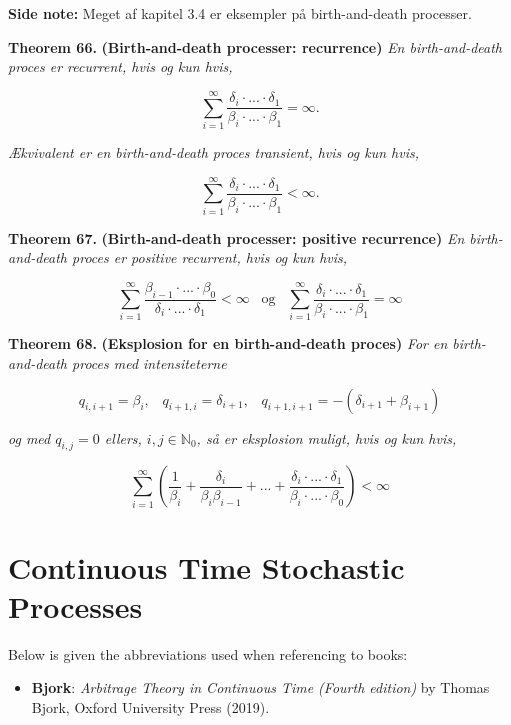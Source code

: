 \documentclass[a4paper,10pt,openany]{book}
\providecommand{\tightlist}{%
 \setlength{\itemsep}{0pt}\setlength{\parskip}{0pt}}
\begin{document}
\textbf{Side note:} Meget af kapitel 3.4 er eksempler på birth-and-death processer.

\textbf{Theorem 66.} \textbf{(Birth-and-death processer: recurrence)} \emph{En birth-and-death proces er recurrent, hvis og kun hvis,}

\[
\sum_{i=1}^\infty\frac{\delta_i\cdot...\cdot \delta_1}{\beta_i\cdot...\cdot \beta_1} = \infty.
\]

\emph{Ækvivalent er en birth-and-death proces transient, hvis og kun hvis,}

\[
\sum_{i=1}^\infty\frac{\delta_i\cdot...\cdot \delta_1}{\beta_i\cdot...\cdot \beta_1} < \infty.
\]

\textbf{Theorem 67.} \textbf{(Birth-and-death processer: positive recurrence)} \emph{En birth-and-death proces er positive recurrent, hvis og kun hvis,}

\[
\sum_{i=1}^\infty\frac{\beta_{i-1}\cdot...\cdot \beta_0}{\delta_i\cdot...\cdot \delta_1} < \infty \hspace{10pt} \text{og} \hspace{10pt} \sum_{i=1}^\infty\frac{\delta_i\cdot...\cdot \delta_1}{\beta_i\cdot...\cdot \beta_1} = \infty
\]

\textbf{Theorem 68.} \textbf{(Eksplosion for en birth-and-death proces)} \emph{For en birth-and-death proces med intensiteterne}

\[
q_{i,i+1} = \beta_i, \hspace{10pt} q_{i+1,i}=\delta_{i+1}, \hspace{10pt} q_{i+1,i+1} = -(\delta_{i+1}+\beta_{i+1})
\]

\emph{og med \(q_{i,j} = 0\) ellers, \(i,j \in \mathbb{N}_0\), så er eksplosion muligt, hvis og kun hvis,}

\[
\sum_{i=1}^\infty\left(\frac{1}{\beta_i}+\frac{\delta_i}{\beta_i\beta_{i-1}}+...+\frac{\delta_i\cdot...\cdot \delta_1}{\beta_i\cdot...\cdot \beta_0}\right)<\infty
\]

\hypertarget{continuous-time-stochastic-processes}{%
\chapter{Continuous Time Stochastic Processes}\label{continuous-time-stochastic-processes}}

Below is given the abbreviations used when referencing to books:

\begin{itemize}
\tightlist
\item
  \textbf{Bjork}: \emph{Arbitrage Theory in Continuous Time (Fourth edition)} by Thomas Bjork, Oxford University Press (2019).\cite{bjork2009}
\end{itemize}
\end{document}
